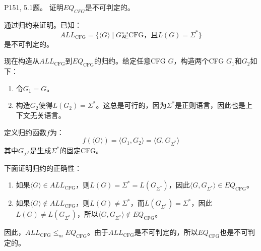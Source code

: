 \documentclass[11pt,addpoints,answers]{exam}
\begin{document}
\begin{questions}


\question P151, 5.1题。
证明$EQ_{\textit{CFG}}$是不可判定的。
\begin{solution}
    通过归约来证明。已知：
    \[
    ALL_{\text{CFG}} = \{ \langle G \rangle \mid G \text{是CFG，且} L(G) = \Sigma^* \}
    \]
    是不可判定的。
    
    现在构造从$ALL_{\text{CFG}}$到$EQ_{\text{CFG}}$的归约。给定任意CFG $G$，构造两个CFG $G_1$和$G_2$如下：
    \begin{enumerate}
        \item 令$G_1 = G$。
        \item 构造$G_2$使得$L(G_2) = \Sigma^*$。这总是可行的，因为$\Sigma^*$是正则语言，因此也是上下文无关语言。
    \end{enumerate}
    
    定义归约函数$f$为：
    \[
    f(\langle G \rangle) = \langle G_1, G_2 \rangle = \langle G, G_{\Sigma^*} \rangle
    \]
    其中$G_{\Sigma^*}$是生成$\Sigma^*$的固定CFG。
    
    下面证明归约的正确性：
    \begin{enumerate}
        \item 如果$\langle G \rangle \in ALL_{\text{CFG}}$，则$L(G) = \Sigma^* = L(G_{\Sigma^*})$，因此$\langle G, G_{\Sigma^*} \rangle \in EQ_{\text{CFG}}$。
        \item 如果$\langle G \rangle \notin ALL_{\text{CFG}}$，则$L(G) \neq \Sigma^*$，而$L(G_{\Sigma^*}) = \Sigma^*$，因此$L(G) \neq L(G_{\Sigma^*})$，所以$\langle G, G_{\Sigma^*} \rangle \notin EQ_{\text{CFG}}$。
    \end{enumerate}
    
    因此，$ALL_{\text{CFG}} \leq_m EQ_{\text{CFG}}$。由于$ALL_{\text{CFG}}$是不可判定的，所以$EQ_{\text{CFG}}$也是不可判定的。

\end{solution}




\end{questions}
\end{document}
